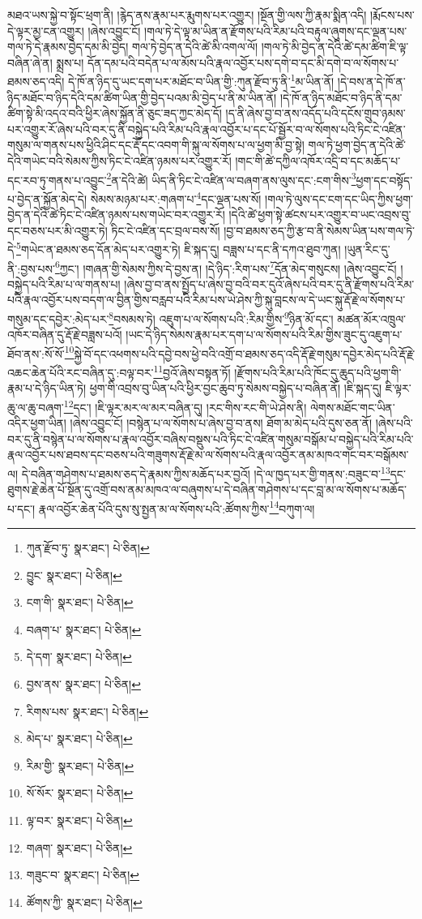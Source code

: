 མཐའ་ཡས་སྐྱེ་བ་སྟོང་ཕྲག་ནི། །རྙེད་ནས་རྣམ་པར་རྨུགས་པར་འགྱུར། །སྔོན་གྱི་ལས་ཀྱི་རྣམ་སྨིན་འདི། །རྨོངས་པས་དེ་ལྟར་མྱ་ངན་འགྱུར། །ཞེས་འབྱུང་ངོ། །གལ་ཏེ་དེ་ལྟ་མ་ཡིན་ན་རྫོགས་པའི་རིམ་པའི་བརྟུལ་ཞུགས་དང་ལྡན་པས་གལ་ཏེ་དེ་རྣམས་བྱེད་དམ་མི་བྱེད། གལ་ཏེ་བྱེད་ན་དེའི་ཚེ་མི་འགལ་ལོ། །གལ་ཏེ་མི་བྱེད་ན་དེའི་ཚེ་དམ་ཚིག་ཇི་ལྟ་བཞིན་ཞེ་ན། སྨྲས་པ། དོན་དམ་པའི་བདེན་པ་ལ་མོས་པའི་རྣལ་འབྱོར་པས་དགེ་བ་དང་མི་དགེ་བ་ལ་སོགས་པ་ཐམས་ཅད་འདི། དེ་ཁོ་ན་ཉིད་དུ་ཡང་དག་པར་མཐོང་བ་ཡིན་གྱི་:ཀུན་རྫོབ་ཏུ་ནི་\footnote{ཀུན་རྫོབ་ཏུ་  སྣར་ཐང་།  པེ་ཅིན། }མ་ཡིན་ནོ། །དེ་བས་ན་དེ་ཁོ་ན་ཉིད་མཐོང་བ་ཉིད་དེའི་དམ་ཚིག་ཡིན་གྱི་བྱེད་པའམ་མི་བྱེད་པ་ནི་མ་ཡིན་ནོ། །དེ་ཁོ་ན་ཉིད་མཐོང་བ་ཉིད་ནི་དམ་ཚིག་སྟེ་མི་འདའ་བའི་ཕྱིར་ཞེས་སྐྱོན་ནི་ཅུང་ཟད་ཀྱང་མེད་དོ། །ད་ནི་ཞེས་བྱ་བ་ནས་འདོད་པའི་དངོས་གྲུབ་ཉམས་པར་འགྱུར་རོ་ཞེས་པའི་བར་དུ་ནི་བསྐྱེད་པའི་རིམ་པའི་རྣལ་འབྱོར་པ་དང་པོ་སྦྱོར་བ་ལ་སོགས་པའི་ཏིང་ངེ་འཛིན་གསུམ་ལ་གནས་པས་ཕྱིའི་ཤིང་དང་རྡོ་དང་འབག་གི་སྐུ་ལ་སོགས་པ་ལ་ཕྱག་མི་བྱ་སྟེ། གལ་ཏེ་ཕྱག་བྱེད་ན་དེའི་ཚེ་དེའི་གཡེང་བའི་སེམས་ཀྱིས་ཏིང་ངེ་འཛིན་ཉམས་པར་འགྱུར་རོ། །གང་གི་ཚེ་དཀྱིལ་འཁོར་འདྲི་བ་དང་མཆོད་པ་དང་རབ་ཏུ་གནས་པ་འབྱུང་\footnote{བྱུང་  སྣར་ཐང་།  པེ་ཅིན། }ན་དེའི་ཚེ། ཡིད་ནི་ཏིང་ངེ་འཛིན་ལ་བཞག་ནས་ལུས་དང་:ངག་གིས་\footnote{ངག་གི་  སྣར་ཐང་།  པེ་ཅིན། }ཕྱག་དང་བསྟོད་པ་བྱེད་ན་སྐྱོན་མེད་དེ། སེམས་མཉམ་པར་:གཞག་པ་\footnote{བཞག་པ་  སྣར་ཐང་།  པེ་ཅིན། }དང་ལྡན་པས་སོ། །གལ་ཏེ་ལུས་དང་ངག་དང་ཡིད་ཀྱིས་ཕྱག་བྱེད་ན་དེའི་ཚེ་ཏིང་ངེ་འཛིན་ཉམས་པས་གཡེང་བར་འགྱུར་རོ། །དེའི་ཚེ་ཕྱག་སྟེ་ཚངས་པར་འགྱུར་བ་ཡང་འབྲས་བུ་དང་བཅས་པར་མི་འགྱུར་ཏེ། ཏིང་ངེ་འཛིན་དང་བྲལ་བས་སོ། །བྱ་བ་ཐམས་ཅད་ཀྱི་རྩ་བ་ནི་སེམས་ཡིན་པས་གལ་ཏེ་དེ་\footnote{དེ་དག་  སྣར་ཐང་།  པེ་ཅིན། }གཡེང་ན་ཐམས་ཅད་དོན་མེད་པར་འགྱུར་ཏེ། ཇི་སྐད་དུ། བཟླས་པ་དང་ནི་དཀའ་ཐུབ་ཀུན། །ཡུན་རིང་དུ་ནི་:བྱས་པས་\footnote{བྱས་ནས་  སྣར་ཐང་།  པེ་ཅིན། }ཀྱང་། །གཞན་གྱི་སེམས་ཀྱིས་དེ་བྱས་ན། །དེ་ཉིད་:རིག་པས་\footnote{རིགས་པས་  སྣར་ཐང་།  པེ་ཅིན། }དོན་མེད་གསུངས། །ཞེས་འབྱུང་ངོ། །བསྐྱེད་པའི་རིམ་པ་ལ་གནས་པ། །ཞེས་བྱ་བ་ནས་སྤྱོད་པ་ཞེས་བྱ་བའི་བར་དུའོ་ཞེས་པའི་བར་དུ་ནི་རྫོགས་པའི་རིམ་པའི་རྣལ་འབྱོར་པས་བདག་ལ་བྱིན་གྱིས་བརླབ་པའི་རིམ་པས་ཡེ་ཤེས་ཀྱི་སྐུ་བླངས་ལ་དེ་ཡང་སྐུ་རྡོ་རྗེ་ལ་སོགས་པ་གསུམ་དང་དབྱེར་:མེད་པར་\footnote{མེད་པ་  སྣར་ཐང་།  པེ་ཅིན། }བསམས་ཏེ། འཇུག་པ་ལ་སོགས་པའི་:རིམ་གྱིས་\footnote{རིམ་གྱི་  སྣར་ཐང་།  པེ་ཅིན། }ཉིན་མོ་དང་། མཚན་མོར་འཁྲུལ་འཁོར་བཞིན་དུ་རྡོ་རྗེ་བཟླས་པའོ། །ཡང་དེ་ཉིད་སེམས་རྣམ་པར་དག་པ་ལ་སོགས་པའི་རིམ་གྱིས་ཟུང་དུ་འཇུག་པ་ཐོབ་ནས་:སོ་སོ་\footnote{སོ་སོར་  སྣར་ཐང་།  པེ་ཅིན། }སྐྱེ་བོ་དང་འཕགས་པའི་དབྱེ་བས་ཕྱེ་བའི་འགྲོ་བ་ཐམས་ཅད་འདི་རྡོ་རྗེ་གསུམ་དབྱེར་མེད་པའི་རྡོ་རྗེ་འཆང་ཆེན་པོའི་རང་བཞིན་དུ་:བལྟ་བར་\footnote{ལྟ་བར་  སྣར་ཐང་།  པེ་ཅིན། }བྱའོ་ཞེས་བསྟན་ཏོ། །རྫོགས་པའི་རིམ་པའི་ཁོང་དུ་ཆུད་པའི་ཕྱག་གི་རྣམ་པ་དེ་ཉིད་ཡིན་ཏེ། ཕྱག་གི་འབྲས་བུ་ཡིན་པའི་ཕྱིར་བྱང་ཆུབ་ཏུ་སེམས་བསྐྱེད་པ་བཞིན་ནོ། །ཇི་སྐད་དུ། ཇི་ལྟར་ཆུ་ལ་ཆུ་བཞག་\footnote{གཞག་  སྣར་ཐང་།  པེ་ཅིན། }དང་། །ཇི་ལྟར་མར་ལ་མར་བཞིན་དུ། །རང་གིས་རང་གི་ཡེ་ཤེས་ནི། ལེགས་མཐོང་གང་ཡིན་འདིར་ཕྱག་ཡིན། །ཞེས་འབྱུང་ངོ། །བསྙེན་པ་ལ་སོགས་པ་ཞེས་བྱ་བ་ནས། ཐོག་མ་མེད་པའི་དུས་ཅན་ནོ། །ཞེས་པའི་བར་དུ་ནི་བསྙེན་པ་ལ་སོགས་པ་རྣལ་འབྱོར་བཞིས་བསྡུས་པའི་ཏིང་ངེ་འཛིན་གསུམ་བསྒོམ་པ་བསྐྱེད་པའི་རིམ་པའི་རྣལ་འབྱོར་པས་ཐབས་དང་བཅས་པའི་གཟུགས་རྡོ་རྗེ་མ་ལ་སོགས་པའི་རྣལ་འབྱོར་ནམ་མཁའ་གང་བར་བསྒོམས་ལ། དེ་བཞིན་གཤེགས་པ་ཐམས་ཅད་དེ་རྣམས་ཀྱིས་མཆོད་པར་བྱའོ། །དེ་ལ་ཁྱད་པར་གྱི་གནས་:བཟུང་བ་\footnote{གཟུང་བ་  སྣར་ཐང་།  པེ་ཅིན། }དང་ཐུགས་རྗེ་ཆེན་པོ་སྔོན་དུ་འགྲོ་བས་ནམ་མཁའ་ལ་བཞུགས་པ་དེ་བཞིན་གཤེགས་པ་དང་བླ་མ་ལ་སོགས་པ་མཆོད་པ་དང་། རྣལ་འབྱོར་ཆེན་པོའི་དུས་སུ་སྤྱན་མ་ལ་སོགས་པའི་:ཚོགས་ཀྱིས་\footnote{ཚོགས་ཀྱི་  སྣར་ཐང་།  པེ་ཅིན། }བཀུག་ལ། 